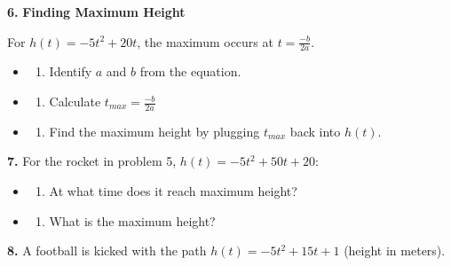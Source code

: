 \documentclass[
  11pt,
]{article}
\providecommand{\tightlist}{%
  \setlength{\itemsep}{0pt}\setlength{\parskip}{0pt}}
\begin{document}
\textbf{6.} \textbf{Finding Maximum Height}

For \(h(t) = -5t^2 + 20t\), the maximum occurs at \(t = \frac{-b}{2a}\).

\begin{itemize}
\item
  \begin{enumerate}
  \def\labelenumi{(\alph{enumi})}
  \tightlist
  \item
    Identify \(a\) and \(b\) from the equation.
  \end{enumerate}
\item
  \begin{enumerate}
  \def\labelenumi{(\alph{enumi})}
  \setcounter{enumi}{1}
  \tightlist
  \item
    Calculate \(t_{max} = \frac{-b}{2a}\)
  \end{enumerate}
\item
  \begin{enumerate}
  \def\labelenumi{(\alph{enumi})}
  \setcounter{enumi}{2}
  \tightlist
  \item
    Find the maximum height by plugging \(t_{max}\) back into \(h(t)\).
  \end{enumerate}
\end{itemize}

\textbf{7.} For the rocket in problem 5, \(h(t) = -5t^2 + 50t + 20\):

\begin{itemize}
\item
  \begin{enumerate}
  \def\labelenumi{(\alph{enumi})}
  \tightlist
  \item
    At what time does it reach maximum height?
  \end{enumerate}
\item
  \begin{enumerate}
  \def\labelenumi{(\alph{enumi})}
  \setcounter{enumi}{1}
  \tightlist
  \item
    What is the maximum height?
  \end{enumerate}
\end{itemize}

\textbf{8.} A football is kicked with the path
\(h(t) = -5t^2 + 15t + 1\) (height in meters).
\end{document}
